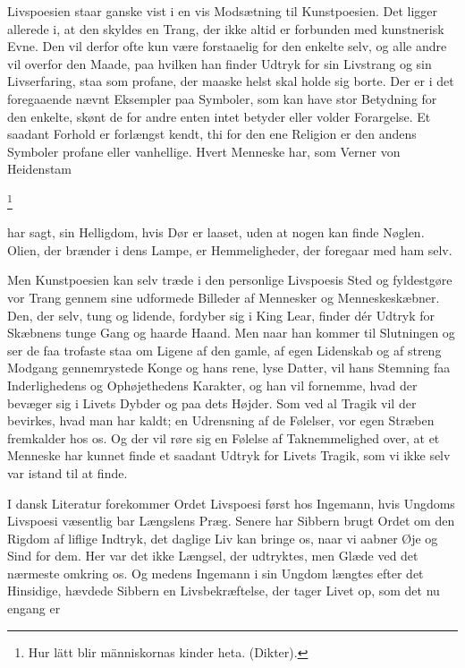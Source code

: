 \documentclass[12pt]{article}
\newcommand{\apage}[1]{\marginnote{\footnotesize\textit{[#1]}}}
\begin{document}
Livspoesien staar ganske vist i en vis Modsætning til Kunstpoesien. Det ligger
allerede i, at den skyldes en Trang, der ikke altid er forbunden med
kunstnerisk Evne. Den vil derfor ofte kun være forstaaelig for den enkelte
selv, og alle andre vil overfor den Maade, paa hvilken han finder
\setcounter{footnote}{0}%
\apage{120}Udtryk for sin Livstrang og sin Livserfaring, staa som profane, der
maaske helst skal holde sig borte. Der er i det foregaaende nævnt Eksempler paa
Symboler, som kan have stor Betydning for den enkelte, skønt de for andre enten
intet betyder eller volder Forargelse. Et saadant Forhold er forlængst kendt,
thi for den ene Religion er den andens Symboler profane eller vanhellige. Hvert
Menneske har, som Verner von Heidenstam

         \footnote{Hur lätt blir människornas kinder heta. (Dikter).}

       har sagt, sin Helligdom, hvis Dør er laaset, uden at nogen kan finde
Nøglen. Olien, der brænder i dens Lampe, er Hemmeligheder, der foregaar med ham selv.

Men Kunstpoesien kan selv træde i den personlige Livspoesis Sted og fyldestgøre
vor Trang gennem sine udformede Billeder af Mennesker og Menneskeskæbner. Den,
der selv, tung og lidende, fordyber sig i \guillemotright{}King
Lear\guillemotleft{}, finder dér Udtryk for Skæbnens tunge Gang og haarde
Haand. Men naar han kommer til Slutningen og ser de faa trofaste staa om Ligene
af den gamle, af egen Lidenskab og af streng Modgang gennemrystede Konge og
hans rene, lyse Datter, vil hans Stemning faa Inderlighedens og Ophøjethedens
Karakter, og han vil fornemme, hvad der bevæger sig i Livets Dybder og paa dets
Højder. Som ved al Tragik vil der bevirkes, hvad man har kaldt; en
\guillemotright{}Udrensning\guillemotleft{} af de Følelser, vor egen Stræben
fremkalder hos os. Og der vil røre sig en Følelse af Taknemmelighed over, at et
Menneske har kunnet finde et saadant Udtryk for Livets Tragik, som vi ikke selv
var istand til at finde.

I dansk Literatur forekommer Ordet Livspoesi først hos Ingemann, hvis Ungdoms
Livspoesi væsentlig bar Længslens Præg. Senere har Sibbern brugt Ordet om den
Rigdom af liflige Indtryk, det daglige Liv kan bringe os,
\setcounter{footnote}{0}%
\apage{121}naar vi aabner Øje og Sind for dem. Her var det ikke Længsel, der
udtryktes, men Glæde ved det nærmeste omkring os. Og medens Ingemann i sin
Ungdom længtes efter det Hinsidige, hævdede Sibbern en Livsbekræftelse, der
tager Livet op, som det nu engang er
\end{document}
